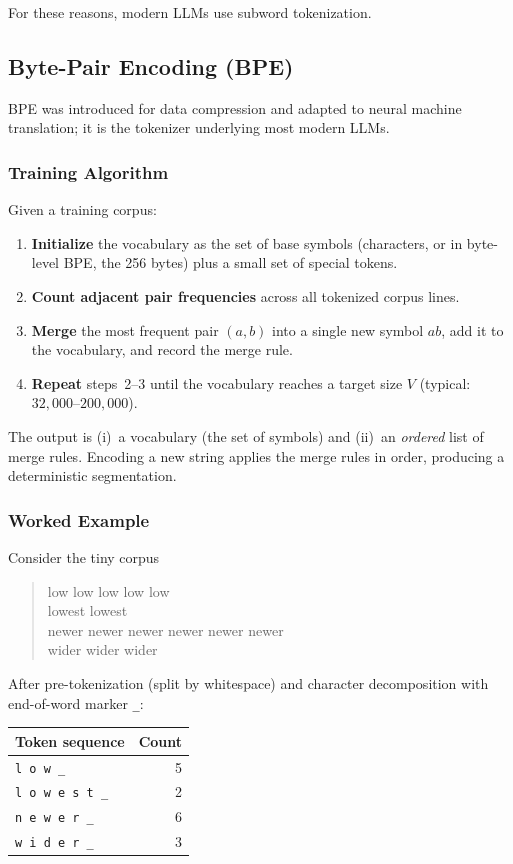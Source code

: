 For these reasons, modern LLMs use subword tokenization.

\subsection{Byte-Pair Encoding (BPE)}

BPE was introduced for data compression \citep{sennrich2016bpe} and
adapted to neural machine translation; it is the tokenizer underlying
most modern LLMs.

\subsubsection{Training Algorithm}

Given a training corpus:
\begin{enumerate}
  \item \textbf{Initialize} the vocabulary as the set of base symbols
        (characters, or in byte-level BPE, the 256 bytes) plus a small
        set of special tokens.
  \item \textbf{Count adjacent pair frequencies} across all tokenized
        corpus lines.
  \item \textbf{Merge} the most frequent pair $(a, b)$ into a single
        new symbol $ab$, add it to the vocabulary, and record the
        merge rule.
  \item \textbf{Repeat} steps~2--3 until the vocabulary reaches a
        target size $V$ (typical: $32{,}000$--$200{,}000$).
\end{enumerate}
The output is (i)~a vocabulary (the set of symbols) and (ii)~an
\emph{ordered} list of merge rules. Encoding a new string applies the
merge rules in order, producing a deterministic segmentation.

\subsubsection{Worked Example}

Consider the tiny corpus
\begin{quote}\ttfamily
low low low low low\\
lowest lowest\\
newer newer newer newer newer newer\\
wider wider wider
\end{quote}
After pre-tokenization (split by whitespace) and character
decomposition with end-of-word marker \texttt{\_}:

\begin{center}
\begin{tabular}{|l|r|}
\hline
Token sequence & Count \\
\hline
\texttt{l o w \_}                  & 5 \\
\texttt{l o w e s t \_}            & 2 \\
\texttt{n e w e r \_}              & 6 \\
\texttt{w i d e r \_}              & 3 \\
\hline
\end{tabular}
\end{center}

